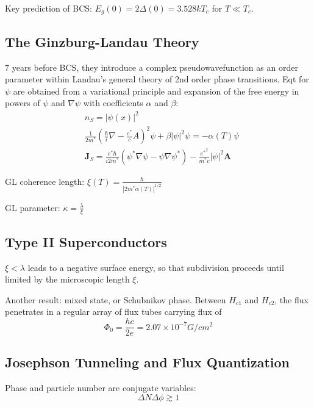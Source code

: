 \documentclass[8pt,a4paper,twocolumn]{article} %
\numberwithin{equation}{section} %
\begin{document}
			Key prediction of BCS: $E_g(0) = 2 \Delta(0) =3.528kT_c $ for $T\ll T_c$.


		\subsection{The Ginzburg-Landau Theory} %
		\label{sub:the_ginzburg_landau_theory}
			7 years before BCS, they introduce a complex pseudowavefunction as an order parameter within Landau's general theory of 2nd order phase transitions. Eqt for $\psi$ are obtained from a variational principle and expansion of the free energy in powers of $\psi$ and $\nabla \psi$ with coefficients $\alpha$ and $\beta$:
			\begin{align}
				&n_S = \left| \psi(x) \right|^2\\
				&\frac{1}{2m^*}\left( \frac{\hbar}{i}\nabla -\frac{e^*}{c}A \right)^2 \psi+\beta|\psi|^2 \psi=-\alpha(T) \psi\\
				&\bm J_S =\frac{e^* \hbar}{i2m^*}(\psi^* \nabla \psi -\psi \nabla \psi^*)-\frac{{e^*}^2}{m^*c}|\psi|^2\bm A
			\end{align}

			GL coherence length: $\xi(T)=\frac{\hbar}{|2m^* \alpha(T) |^{1/2}} $

			GL parameter: $ \kappa = \frac{\lambda}{\xi} $


		\subsection{Type II Superconductors} %
		\label{sub:type_ii_superconductors}
			$\xi<\lambda$ leads to a negative surface energy, so that subdivision proceeds until limited by the microscopic length $\xi$.

			Another result: mixed state, or Schubnikov phase. Between $H_{c1}$ and $ H_{c2} $, the flux penetrates in a regular array of flux tubes carrying flux of
			\begin{equation}
				\Phi_0=\frac{hc}{2e}=2.07\times10^{-7}G/cm^2
			\end{equation}

		\subsection{Josephson Tunneling and Flux Quantization} %
		\label{sub:josephson_tunneling_and_flux_quantization}
			Phase and particle number are conjugate variables:
			\begin{equation}
				\Delta N \Delta \phi \gtrsim 1
			\end{equation}
\end{document}
